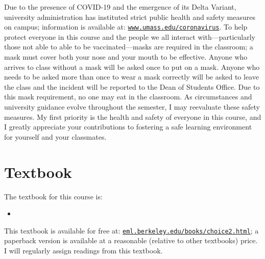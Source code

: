 \documentclass[11pt,letterpaper]{article}
\begin{document}
Due to the presence of COVID-19 and the emergence of its Delta Variant, university administration has instituted strict public health and safety measures on campus; information is available at: \href{https://www.umass.edu/coronavirus/}{\texttt{www.umass.edu/coronavirus}}. To help protect everyone in this course and the people we all interact with---particularly those not able to able to be vaccinated---masks are required in the classroom; a mask must cover both your nose and your mouth to be effective. Anyone who arrives to class without a mask will be asked once to put on a mask. Anyone who needs to be asked more than once to wear a mask correctly will be asked to leave the class and the incident will be reported to the Dean of Students Office. Due to this mask requirement, no one may eat in the classroom. As circumstances and university guidance evolve throughout the semester, I may reevaluate these safety measures. My first priority is the health and safety of everyone in this course, and I greatly appreciate your contributions to fostering a safe learning environment for yourself and your classmates.

\section*{Textbook}

The textbook for this course is:
\begin{itemize}
	\item[] \begin{refsection} \nocite{trainDiscreteChoiceMethods2009} \printbibliography[heading=none] \end{refsection}
\end{itemize}
This textbook is available for free at: \href{https://eml.berkeley.edu/books/choice2.html}{\texttt{eml.berkeley.edu/books/choice2.html}}; a paperback version is available at a reasonable (relative to other textbooks) price. I will regularly assign readings from this textbook. \\
\end{document}
